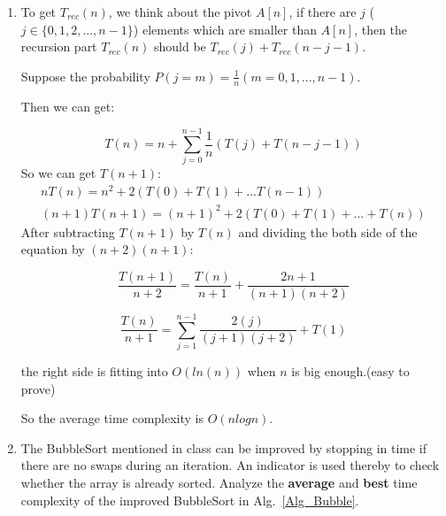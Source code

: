 \documentclass[12pt,a4paper]{article}
\makeatletter
\newtheorem*{solution}{Solution}
\theoremstyle{definition}
\renewenvironment{solution}[1][Solution] {\par\pushQED{\qed}\normalfont\topsep6\p@\@plus6\p@\relax\trivlist\item[\hskip\labelsep\bfseries#1\@addpunct{.}]\ignorespaces}{\popQED\endtrivlist\@endpefalse} \makeatother
\makeatother
\begin{document}
\begin{enumerate}
\begin{solution}
           To get $T_{rec}(n)$, we think about the pivot $A[n]$, if there are $j$ ($j \in \{0, 1, 2, ..., n - 1\}$) elements which are 
           smaller than $A[n]$, then the recursion part $T_{rec}(n)$ should be $T_{rec}(j) + T_{rec}(n - j - 1)$.

           Suppose the probability $P(j = m) = \frac{1}{n} (m = 0, 1, ..., n - 1)$.

           Then we can get:

           \begin{equation*}
               T(n) = n  + \sum_{j = 0}^{n - 1}{\frac{1}{n}(T(j) + T(n - j - 1))} 
           \end{equation*}
So we can get $T(n + 1)$:
           \begin{align*}
              nT(n) = n^2 + 2(T(0) + T(1) + ... T(n - 1)) \\
                 (n + 1)T(n + 1) = (n + 1)^2 + 2(T(0) + T(1) + ... + T(n))
            \end{align*}
 After subtracting $T(n + 1)$ by $T(n)$ and dividing the both side of the equation by $(n + 2)(n + 1)$:
       
 \begin{equation*}
         \frac{T(n + 1)}{n + 2} = \frac{T(n)}{n + 1} + \frac{2n + 1}{(n + 1)(n +2)}
\end{equation*}
         
   \begin{equation*}
      \frac{T(n)}{n + 1} = \sum_{j = 1}^{n - 1}{\frac{2(j)}{(j + 1)(j + 2)}} + T(1) 
   \end{equation*}
   
   the right side is fitting into $O(ln(n))$ when $n$ is big enough.(easy to prove)
   
   So the average time complexity is $O(nlogn)$.

    \end{solution}

    \item
    The BubbleSort mentioned in class can be improved by stopping in time if there are no swaps during an iteration. An indicator is used thereby to check whether the array is already sorted. Analyze the \textbf{average} and \textbf{best} time complexity of the improved BubbleSort in Alg.~\ref{Alg_Bubble}.

    \begin{minipage}[t]{0.8\textwidth}
    \begin{algorithm}[H]


\end{algorithm}
\end{minipage}
\end{enumerate}
\end{document}
